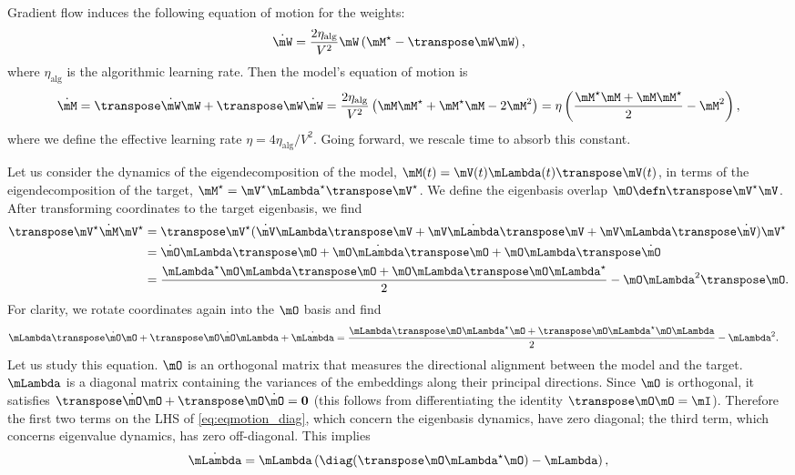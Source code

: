 Gradient flow induces the following equation of motion for the weights:
\begin{equation}
    \dot \mW = \frac{2\eta_\mathrm{alg}}{V^2} \mW \left(\Mstar - \T\mW\mW\right),
    \label{eq:Wdot}
\end{equation}
where $\eta_\mathrm{alg}$ is the algorithmic learning rate. Then the model's equation of motion is
\begin{equation}
    \dot \M = \T{\dot\mW}\mW + \T\mW\dot\mW = \frac{2\eta_\mathrm{alg}}{V^2} \left(\M\Mstar +\Mstar\M - 2\M^2\right) = \eta \left(\frac{\Mstar\M + \M\Mstar}{2} - \M^2\right),
\end{equation}
where we define the effective learning rate $\eta=4\eta_\mathrm{alg}/V^2$. Going forward, we rescale time to absorb this constant.

Let us consider the dynamics of the eigendecomposition of the model, $\M(t)=\mV(t)\L(t)\T{\mV(t)}$, in terms of the eigendecomposition of the target, $\Mstar=\mV^\star\Lstar\T{\mV^\star}$. We define the eigenbasis overlap $\O\defn \T{\mV^\star}\mV$. After transforming coordinates to the target eigenbasis, we find 
\begin{align}
    \T{\mV^\star} \dot\M \mV^\star
    &= \T{\mV^\star}(\dot\mV\L\T\mV + \mV\dot\L\T\mV + \mV\L\T{\dot\mV}) \mV^\star \\
    &= \dot\O\L\T\O + \O\dot\L\T\O + \O\L\T{\dot\O}\\
    &= \frac{\Lstar\O\L\T\O + \O\L\T\O\Lstar}{2} - \O\L^2\T\O.
\end{align}
For clarity, we rotate coordinates again into the $\O$ basis and find
\begin{align}
    \L\T{\dot\O}\O + \T\O\dot\O\L + \dot\L &= \frac{\L\T\O\Lstar\O + \T\O\Lstar\O\L}{2} - \L^2.
    \label{eq:eqmotion_diag}
\end{align}
Let us study this equation. $\O$ is an orthogonal matrix that measures the directional alignment between the model and the target. $\L$ is a diagonal matrix containing the variances of the embeddings along their principal directions. Since $\O$ is orthogonal, it satisfies $\T{\dot\O}\O + \T\O\dot\O = \mathbf{0}$ (this follows from differentiating the identity $\T\O\O=\mI$). Therefore the first two terms on the LHS of \cref{eq:eqmotion_diag}, which concern the eigenbasis dynamics, have zero diagonal; the third term, which concerns eigenvalue dynamics, has zero off-diagonal. This implies
\begin{align}
    \dot\L = \L\left(\diag(\T\O\Lstar\O) - \L\right),
    \label{eq:Ldot}
\end{align}
